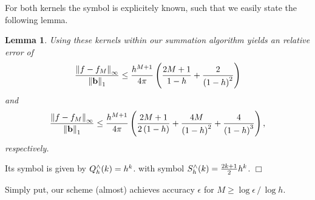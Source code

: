 \documentclass[11pt,a4paper,twoside,bibtotoc]{scrartcl}
\theoremstyle{plain}
\newtheorem{lemma}[theorem]{Lemma}
\theoremstyle{definition}
\theoremstyle{remark}
\newenvironment{proof}{{\bf Proof.}}{$\Box$}
\numberwithin{equation}{section}
\numberwithin{table}{section}
\numberwithin{figure}{section}
\begin{document}
For both kernels the symbol is explicitely known, such that we easily state
the following lemma.
\begin{lemma}
 Using these kernels within our summation algorithm yields an relative error
 of
\begin{equation}
    \label{error:poisson}
    \frac{\left\|f - f_{M}\right\|_{\infty}}{\left\|\mathbf{b}\right\|_1} \le
    \frac{h^{M+1}}{4\pi} \left(\frac{2M+1}{1-h}+\frac{2}{\left(1-h\right)^2}\right)
  \end{equation}
and
\begin{equation}
    \label{error:singular}
    \frac{\left\|f - f_{M}\right\|_{\infty}}{\left\|\mathbf{b}\right\|_1} \le
    \frac{h^{M+1}}{4\pi} \left(\frac{2M+1}{2\left(1-h\right)}+
      \frac{4M}{\left(1-h\right)^2}+ \frac{4}{\left(1-h\right)^3}\right),
  \end{equation}
respectively.
\end{lemma}
\begin{proof}
Its symbol is given by $Q_{h}^{\wedge}{\hspace{-0.4ex}}\left(k\right)=h^k$.
   with symbol $S_{h}^{\wedge}{\hspace{-0.4ex}}\left(k\right) = \frac{2k+1}{2} h^k$.
\end{proof}
  
Simply put, our scheme (almost) achieves accuracy $\epsilon$ for $M \ge \log\epsilon \,
/ \, \log h$.
\end{document}
